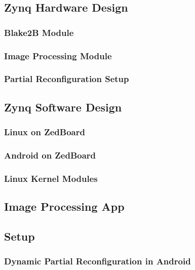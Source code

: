 \subsection{Zynq Hardware Design}\label{ssec:zynqhardwaredesign}

\subsubsection{Blake2B Module}\label{sssec:blake2bmodule}

\subsubsection{Image Processing Module}\label{sssec:imageprocessingmodule}

\subsubsection{Partial Reconfiguration Setup}\label{sssec:partialreconfigurationsetup}

\subsection{Zynq Software Design}\label{ssec:zynqsoftwaredesign}

\subsubsection{Linux on ZedBoard}\label{sssec:linuxonzedboard}

\subsubsection{Android on ZedBoard}\label{sssec:androidonzedboard}

\subsubsection{Linux Kernel Modules}\label{sssec:linuxkernelmodules}

\subsection{Image Processing App}\label{sssec:imageprocessingapp}

\subsection{Setup}\label{ssec:setup}

\subsubsection{Dynamic Partial Reconfiguration in Android}\label{sssec:dynamicpartialreconfiguration}
